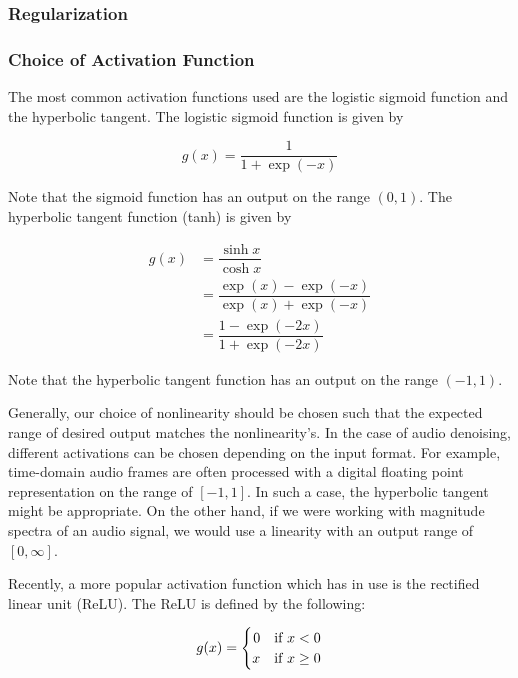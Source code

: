 \subsubsection{Regularization}



\subsubsection{Choice of Activation Function}

The most common activation functions used are the logistic sigmoid function and the hyperbolic tangent. \cite{liu2014experiments} The logistic sigmoid function is given by

\begin{equation}
g(x) = \dfrac{1}{1+\exp{(-x)}}
\end{equation}

Note that the sigmoid function has an output on the range $(0,1)$. The hyperbolic tangent function (tanh) is given by

\begin{align}
g(x) &= \dfrac{\sinh{x}}{\cosh{x}}\\
&= \dfrac{\exp{(x)}-\exp{(-x)}}{\exp{(x)}+\exp{(-x)}}\\
&= \dfrac{1-\exp{(-2x)}}{1+\exp{(-2x)}}
\end{align}

Note that the hyperbolic tangent function has an output on the range $(-1,1)$.

Generally, our choice of nonlinearity should be chosen such that the expected range of desired output matches the nonlinearity's. In the case of audio denoising, different activations can be chosen depending on the input format. For example, time-domain audio frames are often processed with a digital floating point representation on the range of $[-1,1]$. In such a case, the hyperbolic tangent might be appropriate. On the other hand, if we were working with magnitude spectra of an audio signal, we would use a linearity with an output range of $[0,\infty]$.

Recently, a more popular activation function which has in use is the rectified linear unit (ReLU). \cite{glorot2011deep} The ReLU is defined by the following:

\begin{equation}
g(x) =
    \begin{cases}
        \hfill 0 & \text{if $x < 0$}\\
        \hfill x & \text{if $x \ge 0$}
    \end{cases}
\end{equation}

